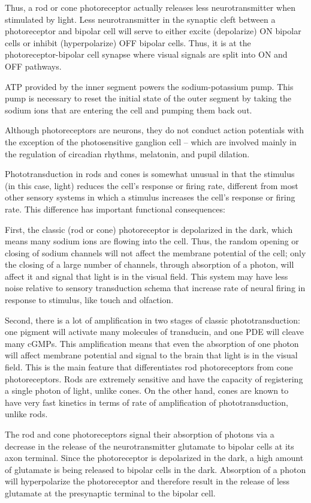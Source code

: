 \documentclass[]{book}
\begin{document}
Thus, a rod or cone photoreceptor actually releases less neurotransmitter when stimulated by light. Less neurotransmitter in the synaptic cleft between a photoreceptor and bipolar cell will serve to either excite (depolarize) ON bipolar cells or inhibit (hyperpolarize) OFF bipolar cells. Thus, it is at the photoreceptor-bipolar cell synapse where visual signals are split into ON and OFF pathways.

ATP provided by the inner segment powers the sodium-potassium pump. This pump is necessary to reset the initial state of the outer segment by taking the sodium ions that are entering the cell and pumping them back out.

Although photoreceptors are neurons, they do not conduct action potentials with the exception of the photosensitive ganglion cell -- which are involved mainly in the regulation of circadian rhythms, melatonin, and pupil dilation.

Phototransduction in rods and cones is somewhat unusual in that the stimulus (in this case, light) reduces the cell's response or firing rate, different from most other sensory systems in which a stimulus increases the cell's response or firing rate. This difference has important functional consequences:

First, the classic (rod or cone) photoreceptor is depolarized in the dark, which means many sodium ions are flowing into the cell. Thus, the random opening or closing of sodium channels will not affect the membrane potential of the cell; only the closing of a large number of channels, through absorption of a photon, will affect it and signal that light is in the visual field. This system may have less noise relative to sensory transduction schema that increase rate of neural firing in response to stimulus, like touch and olfaction.

Second, there is a lot of amplification in two stages of classic phototransduction: one pigment will activate many molecules of transducin, and one PDE will cleave many cGMPs. This amplification means that even the absorption of one photon will affect membrane potential and signal to the brain that light is in the visual field. This is the main feature that differentiates rod photoreceptors from cone photoreceptors. Rods are extremely sensitive and have the capacity of registering a single photon of light, unlike cones. On the other hand, cones are known to have very fast kinetics in terms of rate of amplification of phototransduction, unlike rods.

The rod and cone photoreceptors signal their absorption of photons via a decrease in the release of the neurotransmitter glutamate to bipolar cells at its axon terminal. Since the photoreceptor is depolarized in the dark, a high amount of glutamate is being released to bipolar cells in the dark. Absorption of a photon will hyperpolarize the photoreceptor and therefore result in the release of less glutamate at the presynaptic terminal to the bipolar cell.
\end{document}
